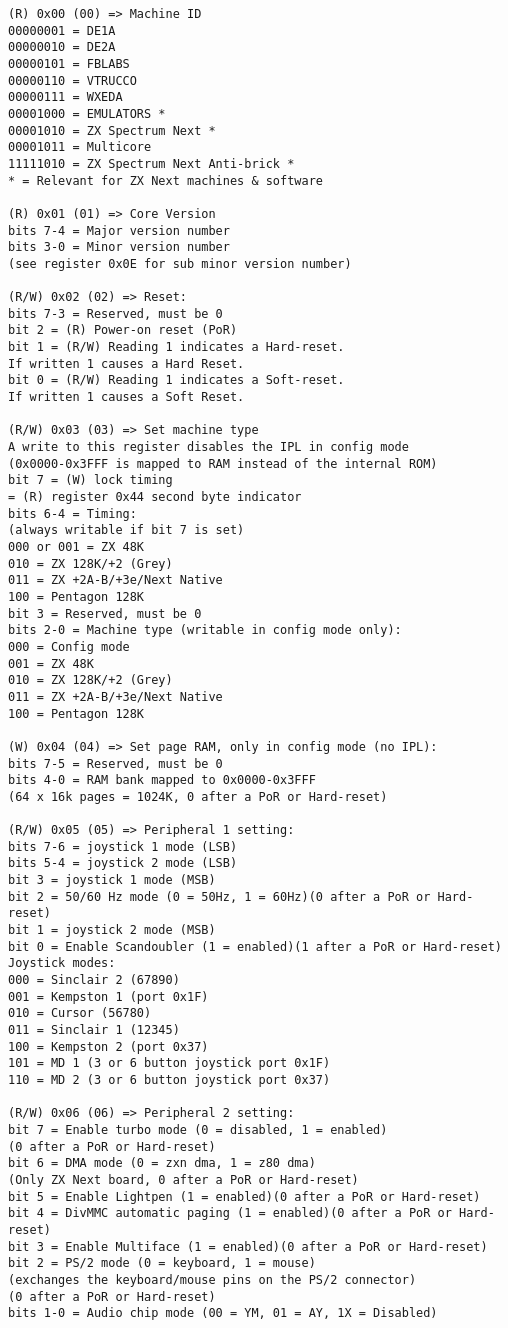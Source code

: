 \begin{verbatim}
(R) 0x00 (00) => Machine ID
00000001 = DE1A
00000010 = DE2A
00000101 = FBLABS
00000110 = VTRUCCO
00000111 = WXEDA
00001000 = EMULATORS *
00001010 = ZX Spectrum Next *
00001011 = Multicore
11111010 = ZX Spectrum Next Anti-brick *
* = Relevant for ZX Next machines & software

(R) 0x01 (01) => Core Version
bits 7-4 = Major version number
bits 3-0 = Minor version number
(see register 0x0E for sub minor version number)

(R/W) 0x02 (02) => Reset:
bits 7-3 = Reserved, must be 0
bit 2 = (R) Power-on reset (PoR)
bit 1 = (R/W) Reading 1 indicates a Hard-reset.
If written 1 causes a Hard Reset.
bit 0 = (R/W) Reading 1 indicates a Soft-reset.
If written 1 causes a Soft Reset.

(R/W) 0x03 (03) => Set machine type
A write to this register disables the IPL in config mode
(0x0000-0x3FFF is mapped to RAM instead of the internal ROM)
bit 7 = (W) lock timing
= (R) register 0x44 second byte indicator
bits 6-4 = Timing:
(always writable if bit 7 is set)
000 or 001 = ZX 48K
010 = ZX 128K/+2 (Grey)
011 = ZX +2A-B/+3e/Next Native
100 = Pentagon 128K
bit 3 = Reserved, must be 0
bits 2-0 = Machine type (writable in config mode only):
000 = Config mode
001 = ZX 48K
010 = ZX 128K/+2 (Grey)
011 = ZX +2A-B/+3e/Next Native
100 = Pentagon 128K

(W) 0x04 (04) => Set page RAM, only in config mode (no IPL):
bits 7-5 = Reserved, must be 0
bits 4-0 = RAM bank mapped to 0x0000-0x3FFF
(64 x 16k pages = 1024K, 0 after a PoR or Hard-reset)

(R/W) 0x05 (05) => Peripheral 1 setting:
bits 7-6 = joystick 1 mode (LSB)
bits 5-4 = joystick 2 mode (LSB)
bit 3 = joystick 1 mode (MSB)
bit 2 = 50/60 Hz mode (0 = 50Hz, 1 = 60Hz)(0 after a PoR or Hard-reset)
bit 1 = joystick 2 mode (MSB)
bit 0 = Enable Scandoubler (1 = enabled)(1 after a PoR or Hard-reset)
Joystick modes:
000 = Sinclair 2 (67890)
001 = Kempston 1 (port 0x1F)
010 = Cursor (56780)
011 = Sinclair 1 (12345)
100 = Kempston 2 (port 0x37)
101 = MD 1 (3 or 6 button joystick port 0x1F)
110 = MD 2 (3 or 6 button joystick port 0x37)

(R/W) 0x06 (06) => Peripheral 2 setting:
bit 7 = Enable turbo mode (0 = disabled, 1 = enabled)
(0 after a PoR or Hard-reset)
bit 6 = DMA mode (0 = zxn dma, 1 = z80 dma)
(Only ZX Next board, 0 after a PoR or Hard-reset)
bit 5 = Enable Lightpen (1 = enabled)(0 after a PoR or Hard-reset)
bit 4 = DivMMC automatic paging (1 = enabled)(0 after a PoR or Hard-reset)
bit 3 = Enable Multiface (1 = enabled)(0 after a PoR or Hard-reset)
bit 2 = PS/2 mode (0 = keyboard, 1 = mouse)
(exchanges the keyboard/mouse pins on the PS/2 connector)
(0 after a PoR or Hard-reset)
bits 1-0 = Audio chip mode (00 = YM, 01 = AY, 1X = Disabled)


\end{verbatim}
